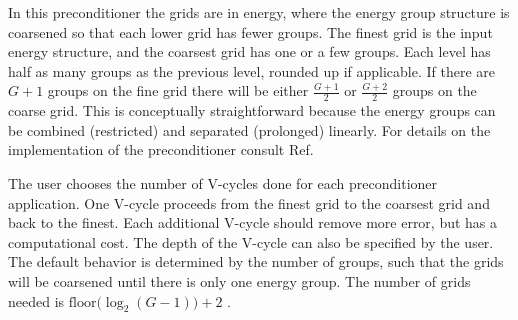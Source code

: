 \documentclass[preprint,12pt]{elsarticle}
\begin{document}

In this preconditioner the grids are in energy, where the energy group structure is coarsened so that each lower grid has fewer groups. The finest grid is the input energy structure, and the coarsest grid has one or a few groups. Each level has half as many groups as the previous level, rounded up if applicable. If there are $G+1$ groups on the fine grid there will be either $\frac{G+1}{2}$ or $\frac{G+2}{2}$ groups on the coarse grid. This is conceptually straightforward because the energy groups can be combined (restricted) and separated (prolonged) linearly. For details on the implementation of the preconditioner consult Ref. \cite{Slaybaugh2013}
%

The user chooses the number of V-cycles done for each preconditioner application. One V-cycle proceeds from the finest grid to the coarsest grid and back to the finest. Each additional V-cycle should remove more error, but has a computational cost. The depth of the V-cycle can also be specified by the user. The default behavior is determined by the number of groups, such that the grids will be coarsened until there is only one energy group. The number of grids needed is $\text{floor}\bigl( \log_{2}(G-1) \bigr) + 2$ \cite{BinaryTree2012}.%
\end{document}
